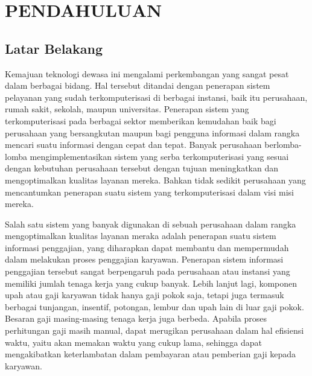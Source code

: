 
\chapter{PENDAHULUAN}

\section{Latar Belakang}
Kemajuan teknologi dewasa ini mengalami perkembangan yang sangat pesat dalam berbagai bidang. Hal tersebut ditandai dengan penerapan sistem pelayanan yang sudah terkomputerisasi di berbagai instansi, baik itu perusahaan, rumah sakit, sekolah, maupun universitas. Penerapan sistem yang terkomputerisasi pada berbagai sektor memberikan kemudahan baik bagi perusahaan yang bersangkutan maupun bagi pengguna informasi dalam rangka mencari suatu informasi dengan cepat dan tepat. Banyak perusahaan berlomba-lomba mengimplementasikan sistem yang serba terkomputerisasi yang sesuai dengan kebutuhan perusahaan tersebut dengan tujuan meningkatkan dan mengoptimalkan kualitas layanan mereka. Bahkan tidak sedikit perusahaan yang mencantumkan penerapan suatu sistem yang terkomputerisasi dalam visi misi mereka.

Salah satu sistem yang banyak digunakan di sebuah perusahaan dalam rangka mengoptimalkan kualitas layanan meraka adalah penerapan suatu sistem informasi penggajian, yang diharapkan dapat membantu dan mempermudah dalam melakukan proses penggajian karyawan. Penerapan sistem informasi penggajian tersebut sangat berpengaruh pada perusahaan atau instansi yang memiliki jumlah tenaga kerja yang cukup banyak. Lebih lanjut lagi, komponen upah atau gaji karyawan tidak hanya gaji pokok saja, tetapi juga termasuk berbagai tunjangan, insentif, potongan, lembur dan upah lain di luar gaji pokok. Besaran gaji masing-masing tenaga kerja juga berbeda. Apabila proses perhitungan gaji masih manual, dapat merugikan perusahaan dalam hal efisiensi waktu, yaitu akan memakan waktu yang cukup lama, sehingga dapat mengakibatkan keterlambatan dalam pembayaran atau pemberian gaji kepada karyawan.

